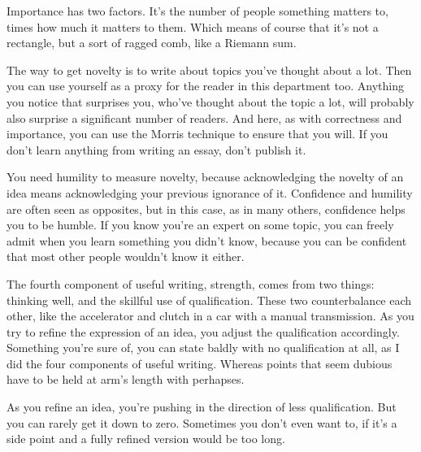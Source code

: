 Importance
                  has two factors. It's the number of people something matters
                  to, times how much it matters to them. Which means of course
                  that it's not a rectangle, but a sort of ragged comb, like a
                  Riemann sum.

The way to get novelty is to write
                  about topics you've thought about a lot. Then you can use
                  yourself as a proxy for the reader in this department too.
                  Anything you notice that surprises you, who've thought about
                  the topic a lot, will probably also surprise a significant
                  number of readers. And here, as with correctness and
                  importance, you can use the Morris technique to ensure that
                  you will. If you don't learn anything from writing an essay,
                  don't publish it.

You need humility to measure
                  novelty, because acknowledging the novelty of an idea means
                  acknowledging your previous ignorance of it. Confidence and
                  humility are often seen as opposites, but in this case, as in
                  many others, confidence helps you to be humble. If you know
                  you're an expert on some topic, you can freely admit when you
                  learn something you didn't know, because you can be confident
                  that most other people wouldn't know it either.

The
                  fourth component of useful writing, strength, comes from two
                  things: thinking well, and the skillful use of qualification.
                  These two counterbalance each other, like the accelerator and
                  clutch in a car with a manual transmission. As you try to
                  refine the expression of an idea, you adjust the qualification
                  accordingly. Something you're sure of, you can state baldly
                  with no qualification at all, as I did the four components of
                  useful writing. Whereas points that seem dubious have to be
                  held at arm's length with perhapses.

As you refine
                  an idea, you're pushing in the direction of less
                  qualification. But you can rarely get it down to zero.
                  Sometimes you don't even want to, if it's a side point and a
                  fully refined version would be too long.

